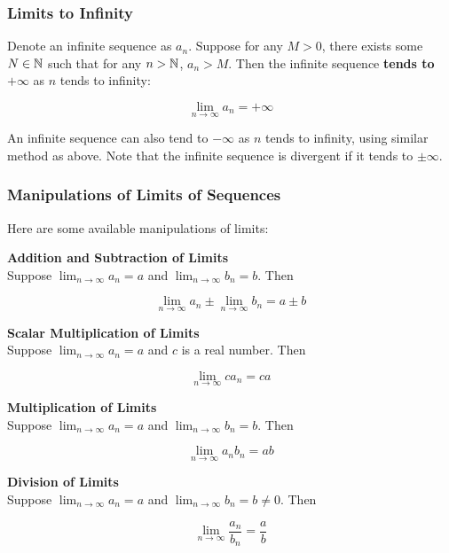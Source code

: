 \documentclass[a4paper,12pt]{article}
\begin{document}
\subsubsection{Limits to Infinity}
\begin{dft}
  Denote an infinite sequence as $a_{n}$. Suppose for any $M>0$, there exists some $N\in\mathbb{N}$ such that for any $n>\mathbb{N}$, $a_{n}>M$. Then the infinite sequence \textbf{tends to} $+\infty$ as $n$ tends to infinity:

  $$\lim_{n\to \infty}a_{n}=+\infty$$
\end{dft}\n

An infinite sequence can also tend to $-\infty$ as $n$ tends to infinity, using similar method as above. Note that the infinite sequence is divergent if it tends to $\pm \infty$.

\subsubsection{Manipulations of Limits of Sequences}
\begin{pst}
  Here are some available manipulations of limits:

  \begin{alist}
    \item \textbf{Addition and Subtraction of Limits}\\
    Suppose $\lim_{n\to\infty}a_{n}=a$ and $\lim_{n\to\infty}b_{n}=b$. Then

    $$\lim_{n\to \infty}a_{n}\pm\lim_{n\to \infty}b_{n}=a\pm b$$

    \item \textbf{Scalar Multiplication of Limits}\\
    Suppose $\lim_{n\to\infty}a_{n}=a$ and $c$ is a real number. Then

    $$\lim_{n\to\infty}ca_{n}=ca$$

    \item \textbf{Multiplication of Limits}\\
    Suppose $\lim_{n\to\infty}a_{n}=a$ and $\lim_{n\to\infty}b_{n}=b$. Then

    $$\lim_{n\to\infty}a_{n}b_{n}=ab$$

    \item \textbf{Division of Limits}\\
    Suppose $\lim_{n\to\infty}a_{n}=a$ and $\lim_{n\to\infty}b_{n}=b\neq 0$. Then

    $$\lim_{n\to\infty}\frac{a_{n}}{b_{n}}=\frac{a}{b}$$
  \end{alist}
\end{pst}
\end{document}

